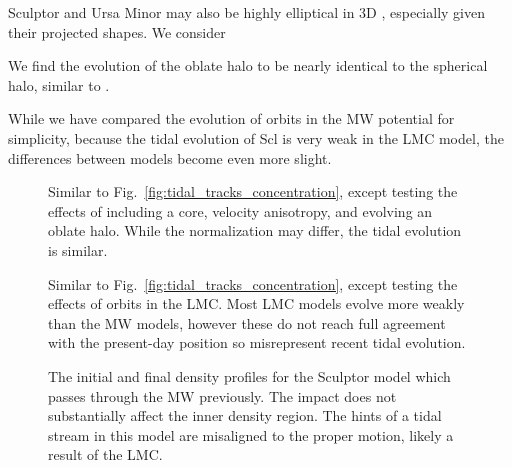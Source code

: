 Sculptor and Ursa Minor may also be highly elliptical in 3D
\citep[e.g.,][]{an+koposov2022}, especially given their projected
shapes. We consider

We find the evolution of the oblate halo to be nearly identical to the
spherical halo, similar to \citet{battaglia+sollima+nipoti2015}.

While we have compared the evolution of orbits in the MW potential for
simplicity, because the tidal evolution of Scl is very weak in the LMC
model, the differences between models become even more slight.

\begin{figure}
\centering
{}
\caption[Tidal dependence on halo structure]{Similar to
Fig.~\ref{fig:tidal_tracks_concentration}, except testing the effects of
including a core, velocity anisotropy, and evolving an oblate halo.
While the normalization may differ, the tidal evolution is
similar.}\label{fig:tidal_tracks_structure}
\end{figure}

\begin{figure}
\centering
{}
\caption[Ursa Minor tidal dependence on orbit]{Similar to
Fig.~\ref{fig:tidal_tracks_concentration}, except testing the effects of
orbits in the LMC. Most LMC models evolve more weakly than the MW
models, however these do not reach full agreement with the present-day
position so misrepresent recent tidal
evolution.}\label{fig:tidal_tracks_umi}
\end{figure}

\begin{figure}
\centering
{}
\caption[Scl MW impact stellar densities]{The initial and final density
profiles for the Sculptor model which passes through the MW previously.
The impact does not substantially affect the inner density region. The
hints of a tidal stream in this model are misaligned to the proper
motion, likely a result of the LMC.}
\end{figure}
